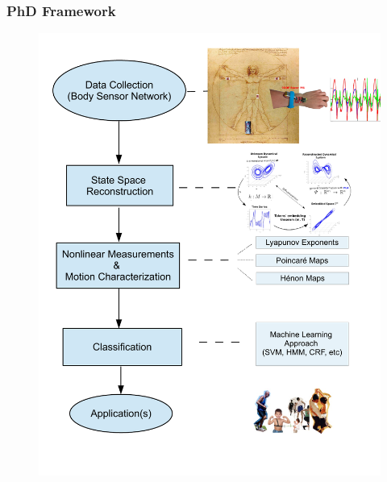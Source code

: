 \documentclass{beamer}
\begin{document}
\begin{frame}
\frametitle{PhD Framework}
\vspace{-0.7cm}

\begin{figure}
\centering 
\includegraphics[scale=0.26]{proposedapproach_v1} \\
\end{figure}

\end{frame}
\end{document}
